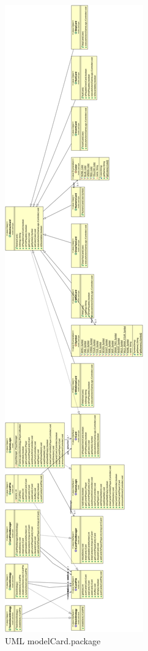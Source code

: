 \documentclass[letterpaper,11pt]{article}
\begin{document}
\begin{figure}[H]
\center
\includegraphics[scale=0.17]{modelCard.png}
\caption{UML modelCard.package}
\end{figure}
\end{document}

